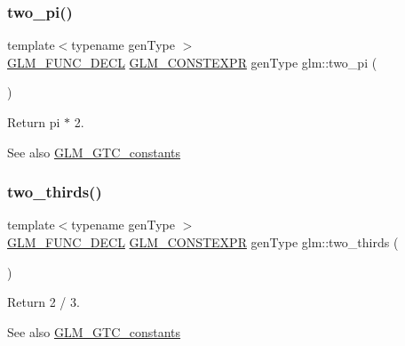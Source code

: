 \subsubsection{\texorpdfstring{two\+\_\+pi()}{two\_pi()}}
{\footnotesize\ttfamily template$<$typename gen\+Type $>$ \\
\hyperlink{setup_8hpp_ab2d052de21a70539923e9bcbf6e83a51}{G\+L\+M\+\_\+\+F\+U\+N\+C\+\_\+\+D\+E\+CL} \hyperlink{setup_8hpp_a08b807947b47031d3a511f03f89645ad}{G\+L\+M\+\_\+\+C\+O\+N\+S\+T\+E\+X\+PR} gen\+Type glm\+::two\+\_\+pi (\begin{DoxyParamCaption}{ }\end{DoxyParamCaption})}

Return pi $\ast$ 2. \begin{DoxySeeAlso}{See also}
\hyperlink{group__gtc__constants}{G\+L\+M\+\_\+\+G\+T\+C\+\_\+constants} 
\end{DoxySeeAlso}
\mbox{\label{group__gtc__constants_ga9b4d2f4322edcf63a6737b92a29dd1f5}} 
\subsubsection{\texorpdfstring{two\+\_\+thirds()}{two\_thirds()}}
{\footnotesize\ttfamily template$<$typename gen\+Type $>$ \\
\hyperlink{setup_8hpp_ab2d052de21a70539923e9bcbf6e83a51}{G\+L\+M\+\_\+\+F\+U\+N\+C\+\_\+\+D\+E\+CL} \hyperlink{setup_8hpp_a08b807947b47031d3a511f03f89645ad}{G\+L\+M\+\_\+\+C\+O\+N\+S\+T\+E\+X\+PR} gen\+Type glm\+::two\+\_\+thirds (\begin{DoxyParamCaption}{ }\end{DoxyParamCaption})}

Return 2 / 3. \begin{DoxySeeAlso}{See also}
\hyperlink{group__gtc__constants}{G\+L\+M\+\_\+\+G\+T\+C\+\_\+constants} 
\end{DoxySeeAlso}
\mbox{\label{group__gtc__constants_ga788f5a421fc0f40a1296ebc094cbaa8a}} 
